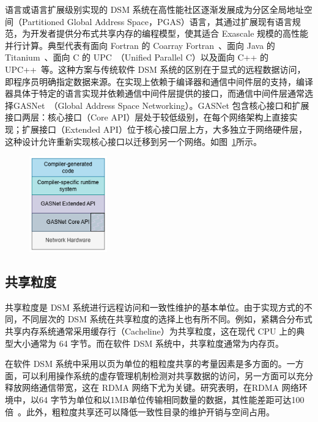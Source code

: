{语言或语言扩展级别实现的 DSM 系统在高性能社区逐渐发展成为分区全局地址空间（Partitioned Global Address Space，PGAS）语言，其通过扩展现有语言规范，为开发者提供分布式共享内存的编程模型，使其适合 Exascale 规模的高性能并行计算。典型代表有面向 Fortran 的 Coarray Fortran~\citep{numrich1998coarrayfortran, coarryfortran2}、面向 Java 的 Titanium~\citep{Yelick1998Titanium}、面向 C 的 UPC~\citep{bonachea2013UPC}（Unified Parallel C）以及面向 C++ 的UPC++~\citep{bachan2019upc++}等。这种方案与传统软件 DSM 系统的区别在于显式的远程数据访问，即程序员明确指定数据来源。在实现上依赖于编译器和通信中间件层的支持，编译器具体于特定的语言实现并依赖通信中间件层提供的接口，而通信中间件层通常选择GASNet~\citep{Bonachea2018GASNetEX}（Global Address Space Networking）。GASNet 包含核心接口和扩展接口两层：核心接口（Core API）层处于较低级别，在每个网络架构上直接实现；扩展接口（Extended API）位于核心接口层上方，大多独立于网络硬件层，这种设计允许重新实现核心接口以迁移到另一个网络。如图~\ref{fig:GASNET}所示。
\begin{figure}
    \centering
    \includegraphics[width=0.3\textwidth]{Img/GASNet.png}
    \label{fig:GASNET}
\end{figure}
\subsection{共享粒度}
共享粒度是 DSM 系统进行远程访问和一致性维护的基本单位。由于实现方式的不同，不同层次的 DSM 系统在共享粒度的选择上也有所不同。例如，紧耦合分布式共享内存系统通常采用缓存行（Cacheline）为共享粒度，这在现代 CPU 上的典型大小通常为 64 字节。而在软件 DSM 系统中，共享粒度通常为内存页。

在软件 DSM 系统中采用以页为单位的粗粒度共享的考量因素是多方面的。一方面，可以利用操作系统的虚存管理机制检测对共享数据的访问，另一方面可以充分释放网络通信带宽，这在 RDMA 网络下尤为关键。研究表明，在RDMA 网络环境中，以64 字节为单位和以1MB单位传输相同数量的数据，其性能差距可达100倍~\citep{dlsm}。此外，粗粒度共享还可以降低一致性目录的维护开销与空间占用。

}
